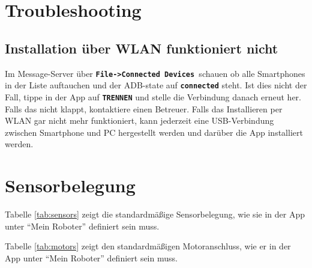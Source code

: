 \documentclass[
	12pt,
	colorbacktitle,
	accentcolor=tud1c,
	german,
	article
]{tuddesign/tudreport}
\newcommand{\bfcode}[1]{\texttt{\textbf{#1}}}
\begin{document}
		\section{Troubleshooting}
		\subsection{Installation über WLAN funktioniert nicht}
		Im Message-Server über \bfcode{File->Connected Devices }schauen ob alle Smartphones in der Liste auftauchen und der ADB-state auf \bfcode{connected} steht. 
		Ist dies nicht der Fall, tippe in der App auf \bfcode{TRENNEN} und stelle die Verbindung danach erneut her.
		Falls das nicht klappt, kontaktiere einen Betreuer. 
		Falls das Installieren per WLAN gar nicht mehr funktioniert, kann jederzeit eine USB-Verbindung zwischen Smartphone und PC hergestellt werden und darüber die App installiert werden.
		
		
		
		\section{Sensorbelegung}
		
		Tabelle	\ref{tab:sensors} zeigt die standardmäßige Sensorbelegung, wie sie in der App unter ``Mein Roboter'' definiert sein muss.
			
		Tabelle \ref{tab:motors} zeigt den standardmäßigen Motoranschluss, wie er in der App unter ``Mein Roboter'' definiert sein muss.
		
\end{document}
